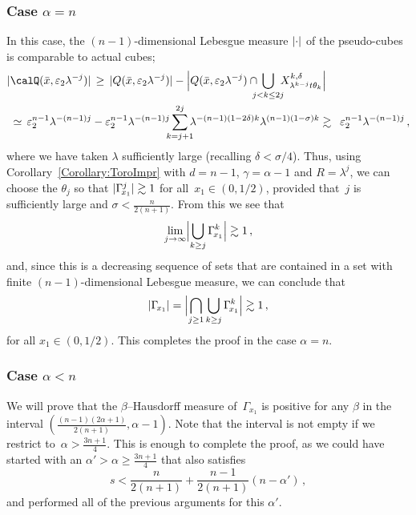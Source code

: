\documentclass[biblatex]{pzorin-note}
\begin{document}
\subsubsection*{Case $\alpha=n$} In this case, the $(n-1)$-dimensional Lebesgue measure $\abs{\cdot}$ of the pseudo-cubes is comparable to actual cubes;
\begin{equation}%
\begin{split}\nonumber
\abs{ & \calQ(\bar{x} , \varepsilon_{2} \lambda^{-j}) } \, \geq \, \abs{Q(\bar{x}, \varepsilon_{2} \lambda^{-j})} -
\abs[\Big]{ Q(\bar{x}, \varepsilon_{2} \lambda^{-j}) \cap \!\!\!\! \bigcup_{j<k\le 2j} \!\!\! X^{k, \delta}_{\lambda^{k-j} t\theta_{k}}}
\\
& \simeq \,
\varepsilon_{2}^{n-1} \lambda^{-(n-1)j} - \varepsilon_{2}^{n-1} \lambda^{-(n-1)j} \!\!\!
\sum_{k=j+1}^{2j} \!\!\! \lambda^{-(n-1)(1-2\delta)k} \lambda^{(n-1)(1-\sigma)k}
\gtrsim\ \, \varepsilon_{2}^{n-1} \lambda^{-(n-1)j} \, ,
\end{split}
\end{equation}
where we have taken $\lambda$ sufficiently large (recalling $\delta < \sigma/4$).
Thus, using Corollary~\ref{Corollary:ToroImpr} with $d=n-1$, $\gamma = \alpha-1$ and $R=\lambda^{j}$, we can choose the $\theta_{j}$
so that $\abs{\Gamma^j_{\!x_1}}\gtrsim1$ for all~$x_{1}\in (0,1/2)$, provided that~$j$ is sufficiently large and $\sigma < \frac{n}{2(n+1)}$. From this we see that
\[
\lim_{j\to\infty} \abs[\Big]{\bigcup_{k\ge j}\Gamma^k_{\!x_1}}\gtrsim1 \, ,
\]
and,
since this is a decreasing sequence of sets that are contained in a set with finite $(n-1)$-dimensional Lebesgue measure,
we can conclude that
\[
\abs{\Gamma_{\!x_1}}=\abs[\Big]{\bigcap_{j\ge1}\bigcup_{k\ge j}\Gamma^k_{\!x_1}}\gtrsim 1 \, ,
\]
for all $x_1\in (0,1/2)$.
This completes the proof in the case $\alpha=n$.

\subsubsection*{Case $\alpha<n$}
We will prove that the $\beta$--Hausdorff measure of~$\Gamma_{\!x_1}$ is positive
for any $\beta$ in the
interval $( \frac{(n-1)(2\alpha +1)}{2(n+1)}, \alpha-1 )$.
Note that the interval is not empty if we
restrict to~$\alpha > \frac{3n+1}{4}$. This is enough
to complete the proof, as we could have started with an $\alpha'>\alpha \geq \frac{3n+1}{4}$ that also satisfies
\[
s < \frac{n}{2(n+1)}+\frac{n-1}{2(n+1)}(n-\alpha') \, ,
\]
and performed all of the previous arguments for this $\alpha'$.
\end{document}
